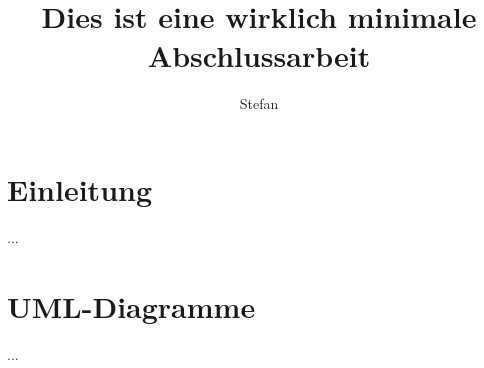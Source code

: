 \documentclass[thesis=bachelor,faculty=cb]{hsmw-thesis}
\title[This is truly a minimal thesis]{Dies ist eine wirklich minimale Abschlussarbeit}
\author{Stefan}{Schildbach}[M.Sc.]<signatur-schildbach.pdf>
\begin{document}
	\chapter{Einleitung}
	...
	
	\appendix %
	\chapter{UML-Diagramme}
	...
\end{document}
